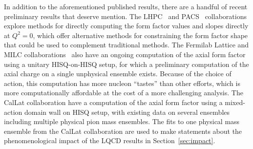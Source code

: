 In addition to the aforementioned published results, there are
 a handful of recent preliminary results that deserve mention.
The LHPC~\cite{Hasan:2017wwt} and PACS~\cite{Ishikawa:2021eut} collaborations
 explore methods for directly computing the form factor values and slopes
 directly at $Q^2=0$, which offer alternative methods for constraining
 the form factor shape that could be used to complement traditional methods.
The Fermilab Lattice and MILC collaborations~\cite{Meyer:2016kwb,Lin:2019pia,Lin:2020wko} also have an ongoing
 computation of the axial form factor using a unitary HISQ-on-HISQ setup,
 for which a preliminary computation of the axial charge on
 a single unphysical ensemble exists.
Because of the choice of action, this computation has more nucleon ``tastes''
 than other efforts, which is more computationally affordable
 at the cost of a more challenging analysis.
The CalLat collaboration have a computation of the axial form factor
 using a mixed-action domain wall on HISQ setup,
 with existing data on several ensembles including multiple physical pion mass ensembles.
The fits to one physical mass ensemble from the CalLat collaboration are used
 to make statements about the phenomenological impact of the LQCD results in Section~\ref{sec:impact}.


